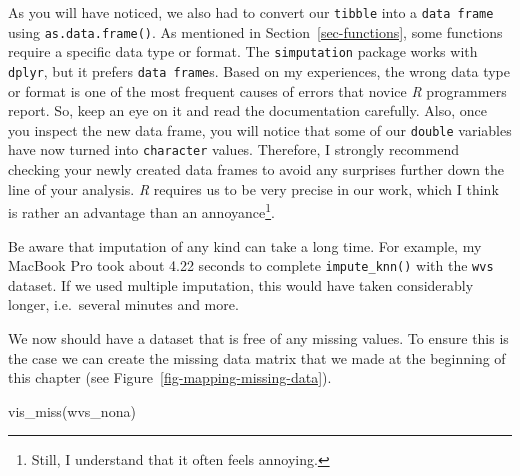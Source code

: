 \documentclass[
  letterpaper,
]{krantz}
\makeatletter
\newenvironment{Shaded}{\begin{snugshade}}{\end{snugshade}}
\newcommand{\FunctionTok}[1]{\textcolor[rgb]{0.28,0.35,0.67}{#1}}
\newcommand{\NormalTok}[1]{\textcolor[rgb]{0.00,0.23,0.31}{#1}}
\newenvironment{kframe}{%
\medskip{}
\setlength{\fboxsep}{.8em}
 \def\at@end@of@kframe{}%
 \ifinner\ifhmode%
  \def\at@end@of@kframe{\end{minipage}}%
  \begin{minipage}{\columnwidth}%
 \fi\fi%
 \def\FrameCommand##1{\hskip\@totalleftmargin \hskip-\fboxsep
 \colorbox{shadecolor}{##1}\hskip-\fboxsep
     \hskip-\linewidth \hskip-\@totalleftmargin \hskip\columnwidth}%
 \MakeFramed {\advance\hsize-\width
   \@totalleftmargin\z@ \linewidth\hsize
   \@setminipage}}%
 {\par\unskip\endMakeFramed%
 \at@end@of@kframe}
\renewenvironment{Shaded}{\begin{kframe}}{\end{kframe}}
\makeatother
\begin{document}
As you will have noticed, we also had to convert our \texttt{tibble}
into a \texttt{data\ frame} using \texttt{as.data.frame()}. As mentioned
in Section~\ref{sec-functions}, some functions require a specific data
type or format. The \texttt{simputation} package works with
\texttt{dplyr}, but it prefers \texttt{data\ frame}s. Based on my
experiences, the wrong data type or format is one of the most frequent
causes of errors that novice \emph{R} programmers report. So, keep an
eye on it and read the documentation carefully. Also, once you inspect
the new data frame, you will notice that some of our \texttt{double}
variables have now turned into \texttt{character} values. Therefore, I
strongly recommend checking your newly created data frames to avoid any
surprises further down the line of your analysis. \emph{R} requires us
to be very precise in our work, which I think is rather an advantage
than an annoyance\footnote{Still, I understand that it often feels
  annoying.}.

Be aware that imputation of any kind can take a long time. For example,
my MacBook Pro took about 4.22 seconds to complete
\texttt{impute\_knn()} with the \texttt{wvs} dataset. If we used
multiple imputation, this would have taken considerably longer,
i.e.~several minutes and more.

We now should have a dataset that is free of any missing values. To
ensure this is the case we can create the missing data matrix that we
made at the beginning of this chapter (see
Figure~\ref{fig-mapping-missing-data}).

\begin{Shaded}
\begin{Highlighting}[]
\FunctionTok{vis\_miss}\NormalTok{(wvs\_nona)}
\end{Highlighting}
\end{Shaded}

\begin{figure}[H]


\caption{\label{fig-mapping-missing-data-imputed-data}}

\end{figure}%
\end{document}
